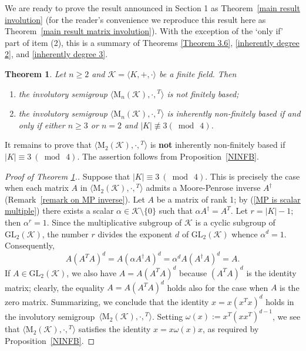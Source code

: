 \documentclass[11pt,reqno]{amsart}
\numberwithin{equation}{section}
\newtheorem{Thm}{Theorem}[section]
\theoremstyle{remark}
\def\om{\omega}
\def\sm{semi\-group}
\begin{document}
We are ready to prove the result announced in Section 1 as
Theorem~\ref{main result involution} (for the reader's convenience
we reproduce this result here as Theorem~\ref{main result matrix
involution}). With the exception of the `only if' part of item
(2), this is a summary of Theorems \ref{Theorem 3.6},
\ref{inherently degree 2}, and \ref{inherently degree 3}.
\begin{Thm}\label{main result matrix involution} Let $n\ge 2$ and
$\mathcal{K}=\langle K,+,\cdot\rangle$ be a finite field. Then
\begin{enumerate}
\item the involutory semigroup $\langle \mathrm{M}_n(\mathcal{K}),\cdot,{}^T\rangle$
is not finitely based;
\item the involutory semigroup $\langle \mathrm{M}_n(\mathcal{K}),\cdot,{}^T\rangle$
is inherently non-finitely based if and only if either $n\ge 3$ or
$n=2$ and $\vert K\vert\mathrel{\not\equiv 3} (\bmod\ 4)$.
\end{enumerate}
\end{Thm}
It remains to prove that
$\langle\mathrm{M}_2(\mathcal{K}),\cdot,{}^T\rangle$ is
\textbf{not} inherently non-finitely based if $\vert K\vert\equiv
3\ (\bmod\ 4)$. The assertion follows from
Proposition~\ref{NINFB}.


\begin{proof}[Proof of Theorem \ref{main result matrix involution}.]
Suppose that $\vert K\vert\equiv 3\ (\bmod\ 4)$. This is precisely
the case when each matrix $A$ in
$\langle\mathrm{M}_2(\mathcal{K}),\cdot,{}^T\rangle$ admits a
Moore-Penrose inverse $A^\dag$ (Remark~\ref{remark on MP
inverse}). Let $A$ be a matrix of rank 1; by (\ref{MP is scalar
multiple}) there exists a scalar $\alpha\in
\mathcal{K}\setminus\{0\}$ such that $\alpha A^\dag= A^T$. Let
$r=\vert K\vert -1$; then $\alpha^r=1$. Since the multiplicative
subgroup of $\mathcal{K}$ is a cyclic subgroup of
$\mathrm{GL}_2(\mathcal{K})$, the number $r$ divides the exponent
$d$ of $\mathrm{GL}_2(\mathcal{K})$ whence $\alpha^d=1$.
Consequently,
$$A(A^TA)^d= A(\alpha A^\dag A)^d=\alpha^d A(A^\dag A)^d=A.$$
If $A\in\mathrm{GL}_2(\mathcal{K})$, we also have $A=A(A^TA)^d$
because $(A^TA)^d$ is the identity matrix; clearly, the equality
$A=A(A^TA)^d$ holds also for the case when $A$ is the zero matrix.
Summarizing, we conclude that the identity $x=x(x^Tx)^d$ holds in
the involutory \sm\
$\langle\mathrm{M}_2(\mathcal{K}),\cdot,{}^T\rangle$. Setting
$\om(x):=x^T(xx^T)^{d-1}$, we see that
$\langle\mathrm{M}_2(\mathcal{K}),\cdot,{}^T\rangle$ satisfies the
identity $x=x\om(x)x$, as required by Proposition~\ref{NINFB}.
\end{proof}
\end{document}
